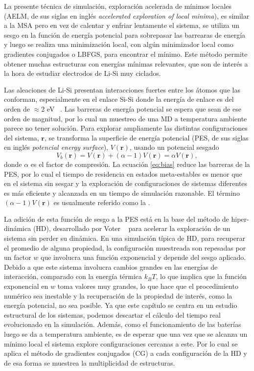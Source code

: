 La presente técnica de simulación, exploración acelerada de mínimos locales (AELM,
de sus siglas en inglés \textit{accelerated exploration of local minima}), es 
similar a la MSA pero en vez de calentar y enfriar lentamente el sistema, se 
utiliza un sesgo en la función de energía potencial para sobrepasar las barrearas
de energía y luego se realiza una minimización local, con algún minimizador local 
como gradientes conjugados o LBFGS, para encontrar el mínimo. Este método permite 
obtener muchas estructuras con energías mínimas relevantes, que son de interés a 
la hora de estudiar electrodos de Li-Si muy ciclados.

Las aleaciones de Li-Si presentan interacciones fuertes entre los átomos que las
conforman, especialmente en el enlace Si-Si donde la energía de enlace es del
orden de $\approx$2 eV ~\cite{wypych2018handbook}. Las barreras de energía 
potencial se espera que sean de ese orden de magnitud, por lo cual un muestreo de 
una MD a temperatura ambiente parece no tener solución. Para explorar ampliamente
las distintas configuraciones del sistema, $\mathbf{r}$, se transforma 
la superficie de energía potencial (PES, de sus siglas en inglés 
\textit{potencial energy surface}), $V(\mathbf{r})$, usando un potencial sesgado
\begin{equation}\label{eq:bias}
    V_b(\mathbf{r}) = V(\mathbf{r}) + (\alpha - 1) V(\mathbf{r}) = \alpha V(\mathbf{r}),
\end{equation}
donde $\alpha$ es el factor de compresión. La ecuación \ref{eq:bias} reduce las
barreras de la PES, por lo cual el tiempo de residencia en estados meta-estables
es menor que en el sistema sin sesgar y la exploración de configuraciones de 
sistemas diferentes es más eficiente y alcanzada en un tiempo de simulación 
razonable. El término $(\alpha - 1) V(\mathbf{r})$ es usualmente referido como 
la .

La adición de esta función de sesgo a la PES está en la base del método de 
hiper-dinámica (HD), desarrollado por Voter ~\cite{voter1997HD,voter1997method} 
para acelerar la exploración de un sistema sin perder su dinámica. En una 
simulación típica de HD, para recuperar el promedio de alguna propiedad, la 
configuración muestreada son repesadas por un factor $w$ que involucra una función
exponencial y depende del sesgo aplicado. Debido a que este sistema involucra 
cambios grandes en las energías de interacción, comparado con la energía térmica
$k_BT$, lo que implica que la función exponencial en $w$ toma valores muy grandes,
lo que hace que el procedimiento numérico sea inestable y la recuperación de 
la propiedad de interés, como la energía potencial, no sea posible. Ya que este
capítulo se centra en un estudio estructural de los sistemas, podemos descartar
el cálculo del tiempo real evolucionado en la simulación. Además, como el 
funcionamiento de las baterías luego se da a temperatura ambiente, es de esperar
que una vez que se alcanza un mínimo local el sistema explore configuraciones
cercanas a este. Por lo cual se aplica el método de gradientes conjugados (CG)
a cada configuración de la HD y de esa forma se muestrea la multiplicidad de 
estructuras.

